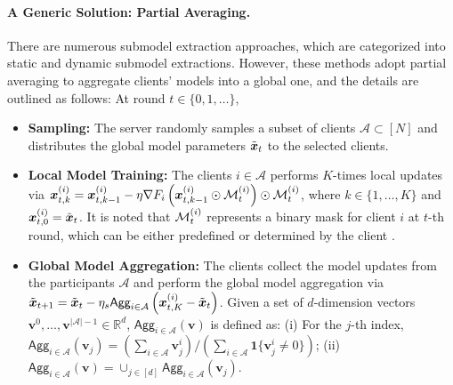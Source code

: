 \documentclass{article}
\renewcommand{\cite}{\citep}
\theoremstyle{plain}
\theoremstyle{definition}
\theoremstyle{remark}
\newcommand{\bracket}[1]{\left(#1\right)}
\begin{document}
\paragraph{A Generic Solution: Partial Averaging.}
There are numerous submodel extraction approaches, which are categorized into static and dynamic submodel extractions. However, these methods adopt partial averaging to aggregate clients' models into a global one, and the details are outlined as follows: At round $t \in \{0, 1, \dots\}$, 
\begin{itemize}[leftmargin=.1in]
    \item \textbf{Sampling:} The server randomly samples a subset of clients $\mathcal{A} \subset [N]$ and distributes the global model parameters $\x{t}$ to the selected clients.
    \item \textbf{Local Model Training:} The clients $i \in \mathcal{A}$ performs $K$-times local updates via $\x{i}{t}{k} = \x{i}{t}{k-1} - \eta \grad{i}{t}{k-1}$, where $k \in \{1, \dots, K\}$ and $\x{i}{t}{0} = \x{t}$. It is noted that $\mask{i}{t}$ represents a binary mask for client $i$ at $t$-th round, which can be either predefined \cite{diao2020heterofl, alam2022fedrolex, ilhan2023scalefl, kang2023nefl} or determined by the client \cite{ yi2024fedp, liao2023adaptive, horvath2021fjord}.
    \item \textbf{Global Model Aggregation:} The clients collect the model updates from the participants $\mathcal{A}$ and perform the global model aggregation via $\x{t+1} = \x{t} - \eta_s \textsf{Agg}_{i \in \mathcal{A}} \bracket{\x{i}{t}{K} - \x{t}}$. Given a set of $d$-dimension vectors $\boldsymbol{v}^{0}, \dots, \boldsymbol{v}^{|\mathcal{A}|-1} \in \mathbb{R}^d$, $\textsf{Agg}_{i \in \mathcal{A}}(\boldsymbol{v})$ is defined as: (i) For the $j$-th index, $\textsf{Agg}_{i \in \mathcal{A}}(\boldsymbol{v}_j) = \left(\sum_{i\in\mathcal{A}} \boldsymbol{v}^{i}_j\right)/\left(\sum_{i\in\mathcal{A}}\boldsymbol{1}\{\boldsymbol{v}^{i}_j\neq 0\}\right)$; (ii) $\textsf{Agg}_{i \in \mathcal{A}}(\boldsymbol{v}) = \cup_{j \in [d]} \textsf{Agg}_{i \in \mathcal{A}}(\boldsymbol{v}_j)$.  
\end{itemize}
\end{document}
